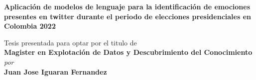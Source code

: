 \begin{titlepage}
\enlargethispage{3cm}

\begin{center}

\vspace*{-1cm}

\textbf{\Large Aplicación de modelos de lenguaje para la identificación de emociones presentes en twitter durante el periodo de elecciones presidenciales en Colombia 2022}\\[10pt]

\vspace*{0.5cm}


Tesis presentada para optar por el titulo de\\ 
\vspace*{0.5cm}
{\Large \bf Magister en Explotación de Datos y Descubrimiento del Conocimiento } \\





                      \vspace{10mm}
                   {\em  por} \\ \vspace{3mm}
             {\large \bf Juan Jose Iguaran Fernandez} \\


\vspace*{10mm}


\end{center}
\end{titlepage}
